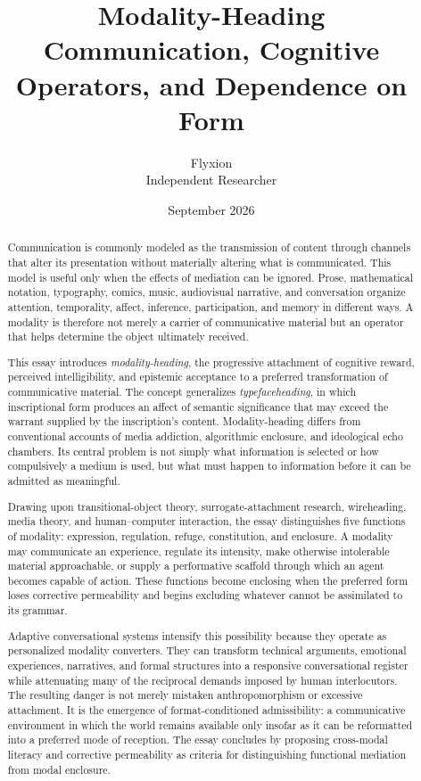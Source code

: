 \documentclass[11pt]{article}
\title{\textbf{Modality-Heading}\\
\large Communication, Cognitive Operators, and Dependence on Form}
\author{Flyxion\\
\small Independent Researcher}
\date{September 2026}
\newcommand{\term}[1]{\emph{#1}}
\begin{document}
\maketitle

\begin{abstract}
Communication is commonly modeled as the transmission of content through
channels that alter its presentation without materially altering what is
communicated. This model is useful only when the effects of mediation can be
ignored. Prose, mathematical notation, typography, comics, music, audiovisual
narrative, and conversation organize attention, temporality, affect,
inference, participation, and memory in different ways. A modality is
therefore not merely a carrier of communicative material but an operator that
helps determine the object ultimately received.

This essay introduces \term{modality-heading}, the progressive attachment of
cognitive reward, perceived intelligibility, and epistemic acceptance to a
preferred transformation of communicative material. The concept generalizes
\term{typefaceheading}, in which inscriptional form produces an affect of
semantic significance that may exceed the warrant supplied by the inscription's
content. Modality-heading differs from conventional accounts of media
addiction, algorithmic enclosure, and ideological echo chambers. Its central
problem is not simply what information is selected or how compulsively a
medium is used, but what must happen to information before it can be admitted
as meaningful.

Drawing upon transitional-object theory, surrogate-attachment research,
wireheading, media theory, and human--computer interaction, the essay
distinguishes five functions of modality: expression, regulation, refuge,
constitution, and enclosure. A modality may communicate an experience,
regulate its intensity, make otherwise intolerable material approachable, or
supply a performative scaffold through which an agent becomes capable of
action. These functions become enclosing when the preferred form loses
corrective permeability and begins excluding whatever cannot be assimilated
to its grammar.

Adaptive conversational systems intensify this possibility because they
operate as personalized modality converters. They can transform technical
arguments, emotional experiences, narratives, and formal structures into a
responsive conversational register while attenuating many of the reciprocal
demands imposed by human interlocutors. The resulting danger is not merely
mistaken anthropomorphism or excessive attachment. It is the emergence of
format-conditioned admissibility: a communicative environment in which the
world remains available only insofar as it can be reformatted into a preferred
mode of reception. The essay concludes by proposing cross-modal literacy and
corrective permeability as criteria for distinguishing functional mediation
from modal enclosure.
\end{abstract}
\end{document}
